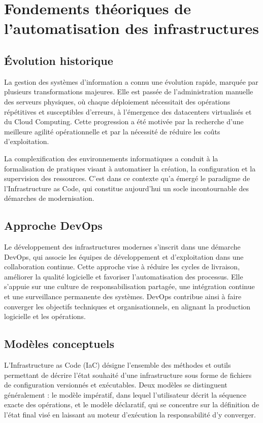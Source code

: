 \section{Fondements théoriques de l’automatisation des infrastructures}

\subsection{Évolution historique}

La gestion des systèmes d’information a connu une évolution rapide, marquée par plusieurs transformations majeures. Elle est passée de l’administration manuelle des serveurs physiques, où chaque déploiement nécessitait des opérations répétitives et susceptibles d’erreurs, à l’émergence des datacenters virtualisés et du Cloud Computing. Cette progression a été motivée par la recherche d’une meilleure agilité opérationnelle et par la nécessité de réduire les coûts d’exploitation.

La complexification des environnements informatiques a conduit à la formalisation de pratiques visant à automatiser la création, la configuration et la supervision des ressources. C’est dans ce contexte qu’a émergé le paradigme de l’Infrastructure as Code, qui constitue aujourd’hui un socle incontournable des démarches de modernisation.

\subsection{Approche DevOps}

Le développement des infrastructures modernes s’inscrit dans une démarche DevOps, qui associe les équipes de développement et d’exploitation dans une collaboration continue. Cette approche vise à réduire les cycles de livraison, améliorer la qualité logicielle et favoriser l’automatisation des processus. Elle s’appuie sur une culture de responsabilisation partagée, une intégration continue et une surveillance permanente des systèmes. DevOps contribue ainsi à faire converger les objectifs techniques et organisationnels, en alignant la production logicielle et les opérations.

\subsection{Modèles conceptuels}

L’Infrastructure as Code (IaC) désigne l’ensemble des méthodes et outils permettant de décrire l’état souhaité d’une infrastructure sous forme de fichiers de configuration versionnés et exécutables. Deux modèles se distinguent généralement : le modèle impératif, dans lequel l’utilisateur décrit la séquence exacte des opérations, et le modèle déclaratif, qui se concentre sur la définition de l’état final visé en laissant au moteur d’exécution la responsabilité d’y converger.

